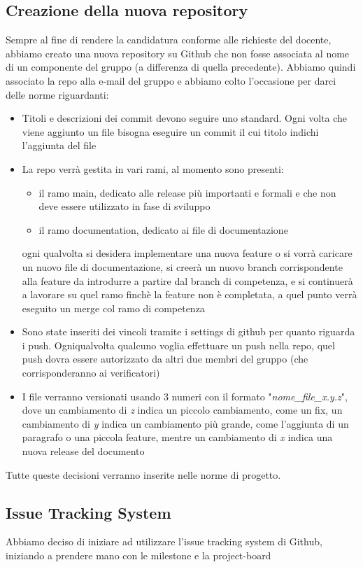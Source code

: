 \subsection{Creazione della nuova repository}
Sempre al fine di rendere la candidatura conforme alle richieste del docente, abbiamo creato una nuova repository su Github che non fosse associata al nome di un componente del gruppo (a differenza di quella precedente). Abbiamo quindi associato la repo alla e-mail del gruppo e abbiamo colto l'occasione per darci delle norme riguardanti:
\begin{itemize}
	\item Titoli e descrizioni dei commit devono seguire uno standard. Ogni volta che viene aggiunto un file bisogna eseguire un commit il cui titolo indichi l'aggiunta del file
	\item La repo verrà gestita in vari rami, al momento sono presenti:
	\begin{itemize}
 		\item il ramo main, dedicato alle release più importanti e formali e che non deve essere utilizzato in fase di sviluppo
		\item il ramo documentation, dedicato ai file di documentazione
	\end{itemize}
	ogni qualvolta si desidera implementare una nuova feature o si vorrà caricare un nuovo file di documentazione, si creerà un nuovo branch corrispondente alla feature da introdurre a partire dal branch di competenza, e si continuerà a lavorare su quel ramo finchè la feature non è completata, a quel punto verrà eseguito un merge col ramo di competenza
	\item Sono state inseriti dei vincoli tramite i settings di github per quanto riguarda i push. Ogniqualvolta qualcuno voglia effettuare un push nella repo, quel push dovra essere autorizzato da altri due membri del gruppo (che corrisponderanno ai verificatori)
	\item I file verranno versionati usando 3 numeri con il formato "\textit{nome\_file\_x.y.z}", dove un cambiamento di \textit{z} indica un piccolo cambiamento, come un fix, un cambiamento di \textit{y} indica un cambiamento più grande, come l'aggiunta di un paragrafo o una piccola feature, mentre  un cambiamento di \textit{x} indica una nuova release del documento
\end{itemize}
Tutte queste decisioni verranno inserite nelle norme di progetto.

\subsection{Issue Tracking System}
Abbiamo deciso di iniziare ad utilizzare l'issue tracking system di Github, iniziando a prendere mano con le milestone e la project-board

